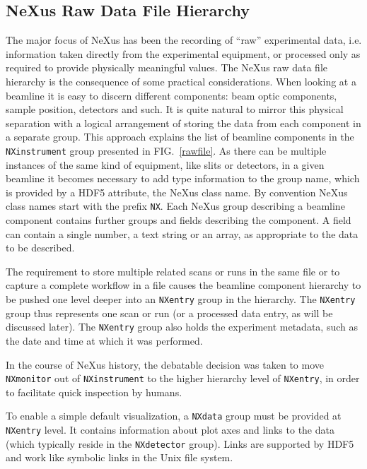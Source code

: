 \documentclass[%
 aip,
rsi,
 amsmath,amssymb,
 reprint,%
]{revtex4-1}
\begin{document}
\subsection{NeXus Raw Data File Hierarchy}
The major focus of NeXus has been the recording of ``raw'' experimental data, i.e. information taken directly from the experimental 
equipment, or processed only as required to provide physically meaningful values.
The NeXus raw data file hierarchy is the consequence of some practical considerations. When looking at a beamline it is easy to 
discern different components: beam optic components, sample position, detectors and such. It is quite natural to mirror this physical 
separation with a logical arrangement of storing the data from each component in a separate group. This approach explains the 
list of beamline components in the \texttt{NXinstrument} group presented in FIG.~\ref{rawfile}. 
As there can be multiple instances of the same kind of equipment, like slits or detectors, in a given beamline it becomes necessary
to add type information to the group name,
which is provided by a HDF5 attribute, the NeXus class name.
By convention NeXus class names start 
with the prefix \texttt{NX}. Each NeXus group describing a beamline component contains further groups and fields describing the component. 
A field can contain a single number, a text string or an array, as appropriate to the data to be described.  

The requirement to store multiple related scans or runs  in the same file or to capture 
a complete workflow in a file causes the beamline component hierarchy to be pushed one level deeper into an \texttt{NXentry} 
group in the hierarchy. The \texttt{NXentry}  group thus represents one scan or run (or a processed data entry, as will be discussed later). 
The \texttt{NXentry} group also holds the experiment metadata, such as the date and time at which it was performed. 

In the course of NeXus history,
the debatable decision was taken to move \texttt{NXmonitor}
out of \texttt{NXinstrument} to the higher hierarchy level of \texttt{NXentry},
in order to facilitate quick inspection by humans.

To enable a simple default visualization,
a \texttt{NXdata} group must be provided at \texttt{NXentry} level.
It contains information about plot axes and links to the data
(which typically reside in the \texttt{NXdetector} group).
Links are supported by HDF5
and work like symbolic links in the Unix file system.
\end{document}
